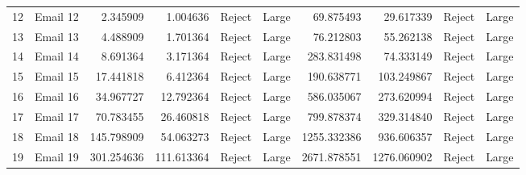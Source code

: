 \begin{tabular}{llrrllrrll}
12 &  Email 12 &           2.345909 &            1.004636 &   Reject &       Large &                69.875493 &                 29.617339 &  Reject &       Large \\
13 &  Email 13 &           4.488909 &            1.701364 &   Reject &       Large &                76.212803 &                 55.262138 &  Reject &       Large \\
14 &  Email 14 &           8.691364 &            3.171364 &   Reject &       Large &               283.831498 &                 74.333149 &  Reject &       Large \\
15 &  Email 15 &          17.441818 &            6.412364 &   Reject &       Large &               190.638771 &                103.249867 &  Reject &       Large \\
16 &  Email 16 &          34.967727 &           12.792364 &   Reject &       Large &               586.035067 &                273.620994 &  Reject &       Large \\
17 &  Email 17 &          70.783455 &           26.460818 &   Reject &       Large &               799.878374 &                329.314840 &  Reject &       Large \\
18 &  Email 18 &         145.798909 &           54.063273 &   Reject &       Large &              1255.332386 &                936.606357 &  Reject &       Large \\
19 &  Email 19 &         301.254636 &          111.613364 &   Reject &       Large &              2671.878551 &               1276.060902 &  Reject &       Large \\
\bottomrule
\end{tabular}

